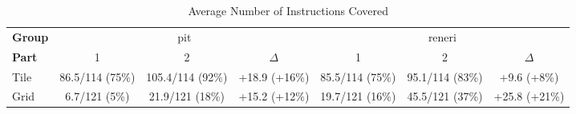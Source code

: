 \begin{sidewaystable}
\centering
\caption{Average Number of Instructions Covered}
\label{tab:average_number_of_instructions_covered}
\begin{tabular}{lcccccc}
\toprule
\textbf{Group} & \multicolumn{3}{c}{pit} & \multicolumn{3}{c}{reneri} \\
\textbf{Part} & 1 & 2 & $\Delta$ & 1 & 2 & $\Delta$ \\
\cmidrule(lr){1-1} \cmidrule(lr){2-4} \cmidrule(lr){5-7}
Tile & 86.5/114 (75\%) & 105.4/114 (92\%) & +18.9 (+16\%) & 85.5/114 (75\%) & 95.1/114 (83\%) & +9.6 (+8\%) \\
Grid & 6.7/121 (5\%) & 21.9/121 (18\%) & +15.2 (+12\%) & 19.7/121 (16\%) & 45.5/121 (37\%) & +25.8 (+21\%) \\
\bottomrule
\end{tabular}
\end{sidewaystable}
